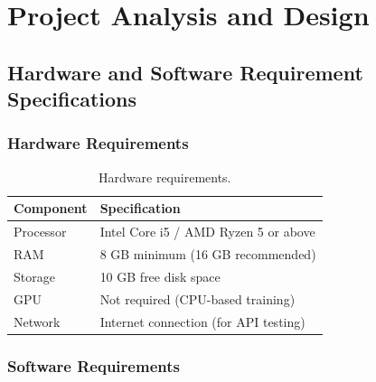 \documentclass[12pt,a4paper]{report}
\begin{document}
\chapter{Project Analysis and Design}

\section{Hardware and Software Requirement Specifications}

\subsection{Hardware Requirements}

\begin{table}[H]
\centering
\caption{Hardware requirements.}
\begin{tabular}{ll}
\hline
\textbf{Component} & \textbf{Specification} \\
\hline
Processor & Intel Core i5 / AMD Ryzen 5 or above \\
RAM & 8 GB minimum (16 GB recommended) \\
Storage & 10 GB free disk space \\
GPU & Not required (CPU-based training) \\
Network & Internet connection (for API testing) \\
\hline
\end{tabular}
\end{table}

\subsection{Software Requirements}
\end{document}
